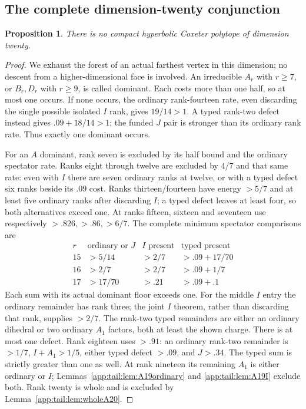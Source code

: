 \documentclass[11pt]{article}
\newtheorem{proposition}[theorem]{Proposition}
\theoremstyle{definition}
\theoremstyle{remark}
\begin{document}
\subsection{The complete dimension-twenty conjunction}
\begin{proposition}\label{app:tail:prop:exact20}
There is no compact hyperbolic Coxeter polytope of dimension twenty.
\end{proposition}
\begin{proof}
We exhaust the forest of an actual farthest vertex in this dimension;
no descent from a higher-dimensional face is involved.
An irreducible $A_r$ with $r\ge7$, or $B_r,D_r$ with $r\ge9$,
is called dominant. Each costs more than one half, so at most
one occurs. If none occurs, the ordinary rank-fourteen rate,
even discarding the single possible isolated $I$ rank, gives
$19/14>1$. A typed rank-two defect instead gives
$.09+18/14>1$; the funded $J$ pair is stronger than its ordinary
rank rate. Thus exactly one dominant occurs.

For an $A$ dominant, rank seven is excluded by its half bound
and the ordinary spectator rate. Ranks eight through twelve
are excluded by $4/7$ and that same rate: even with $I$
there are seven ordinary ranks at twelve, or with a typed
defect six ranks beside its $.09$ cost.
Ranks thirteen/fourteen have energy $>5/7$ and at least five
ordinary ranks after discarding $I$; a typed defect leaves at
least four, so both alternatives exceed one.
At ranks fifteen, sixteen and seventeen use respectively
$>.826,>.86,>6/7$.
The complete minimum spectator comparisons are
\[
\begin{array}{c|c|c|c}
r&\text{ordinary or }J& I\text{ present}&\text{typed present}\\\hline
15&>5/14&>2/7&>.09+17/70\\
16&>2/7&>2/7&>.09+1/7\\
17&>17/70&>.21&>.09+.1
\end{array}
\]
Each sum with its actual dominant floor exceeds one.
For the middle $I$ entry the ordinary remainder has rank three;
the joint $I$ theorem, rather than discarding that rank, supplies
$>2/7$. The rank-two typed remainders are either an ordinary
dihedral or two ordinary $A_1$ factors, both at least the shown
charge. There is at most one defect.
Rank eighteen uses $>.91$: an ordinary rank-two remainder is
$>1/7$, $I+A_1>1/5$, either typed defect $>.09$, and $J>.34$.
The typed sum is strictly greater than one as well.
At rank nineteen its remaining $A_1$ is either ordinary or $I$;
Lemmas~\ref{app:tail:lem:A19ordinary} and
\ref{app:tail:lem:A19I} exclude both. Rank twenty is whole and
is excluded by Lemma~\ref{app:tail:lem:wholeA20}.


\end{proof}
\end{document}
